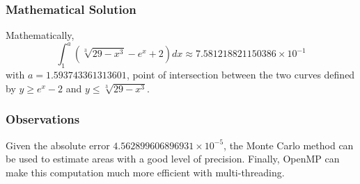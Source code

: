 \documentclass{beamer}
\begin{document}
\begin{frame}
\frametitle{Mathematical Solution}
Mathematically,
$$
\int_1^{a} (\sqrt[3]{29-x^3}-e^x+2)dx\approx 7.581218821150386\times 10^{-1}
$$
with $a=1.593743361313601$, point of intersection between the two curves defined by $y\ge e^x-2$ and $y\le \sqrt[3]{29-x^3}$.
\end{frame}

\begin{frame}
\frametitle{Observations}
Given the absolute error $4.562899606896931\times 10^{-5}$, the Monte Carlo method can be used to estimate areas with a good level of precision. Finally, OpenMP can make this computation much more efficient with multi-threading.
\end{frame}
\end{document}
